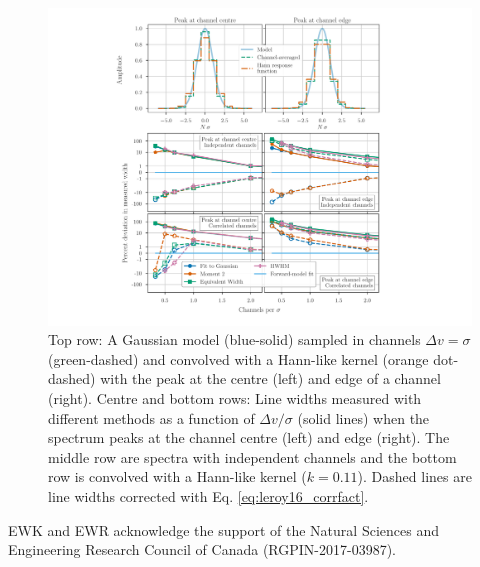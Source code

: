 \documentclass{rnaastex}
\begin{document}
\begin{figure}
\includegraphics[width=\textwidth]{combined_figure}
\caption{\label{fig:width_recovery_comparison} Top row: A Gaussian model (blue-solid) sampled in channels $\Delta v = \sigma$ (green-dashed) and convolved with a Hann-like kernel (orange dot-dashed) with the peak at the centre (left) and edge of a channel (right). Centre and bottom rows: Line widths measured with different methods as a function of $\Delta v / \sigma$ (solid lines) when the spectrum peaks at the channel centre (left) and edge (right). The middle row are spectra with independent channels and the bottom row is convolved with a Hann-like kernel ($k=0.11$). Dashed lines are line widths corrected with Eq. \ref{eq:leroy16_corrfact}.}

\end{figure}

\acknowledgments

EWK and EWR acknowledge the support of the Natural Sciences and Engineering Research Council of Canada (RGPIN-2017-03987).

\end{document}
